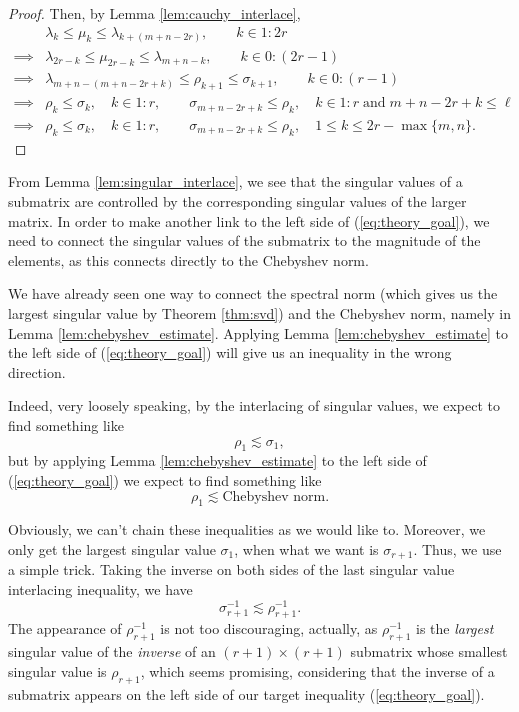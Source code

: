 \documentclass{article}
\begin{document}
\begin{proof}
		Then, by Lemma \ref{lem:cauchy_interlace},
		\begin{align}
			&\lambda_k \le \mu_k \le \lambda_{k+(m+n-2r)}, \qquad k \in 1:2r \\
			\implies&\lambda_{2r-k} \le \mu_{2r-k} \le \lambda_{m+n-k}, \qquad k \in 0:(2r-1) \\
			\implies&\lambda_{m+n -(m+n-2r+k)} \le \rho_{k+1} \le \sigma_{k+1}, \qquad k \in 0:(r-1) \\
			\implies&\rho_k \le \sigma_k, \quad k \in 1:r, \qquad \sigma_{m+n -2r+k} \le \rho_k, \quad k\in 1:r\;\text{and}\;m+n-2r+k \le \ell \\
			\implies&\rho_k \le \sigma_k, \quad k \in 1:r, \qquad \sigma_{m+n -2r+k} \le \rho_k, \quad 1\le k \le 2r-\max\{m,n\}.
		\end{align}
	\end{proof}
	
	From Lemma \ref{lem:singular_interlace}, we see that the singular values of a submatrix are controlled by the corresponding singular values of the larger matrix. In order to make another link to the left side of (\ref{eq:theory_goal}), we need to connect the singular values of the submatrix to the magnitude of the elements, as this connects directly to the Chebyshev norm.
	
	We have already seen one way to connect the spectral norm (which gives us the largest singular value by Theorem \ref{thm:svd}) and the Chebyshev norm, namely in Lemma \ref{lem:chebyshev_estimate}. Applying Lemma \ref{lem:chebyshev_estimate} to the left side of (\ref{eq:theory_goal}) will give us an inequality in the wrong direction.
	
	Indeed, very loosely speaking, by the interlacing of singular values, we expect to find something like
	\begin{equation}
		\rho_{1} \lesssim \sigma_{1},
	\end{equation}
	but by applying Lemma \ref{lem:chebyshev_estimate} to the left side of (\ref{eq:theory_goal}) we expect to find something like
	\begin{equation}
		\rho_{1} \lesssim \text{Chebyshev norm}.
	\end{equation}
	
	Obviously, we can't chain these inequalities as we would like to. Moreover, we only get the largest singular value $\sigma_1$, when what we want is $\sigma_{r+1}$. Thus, we use a simple trick. Taking the inverse on both sides of the last singular value interlacing inequality, we have
	\begin{equation}
		\sigma_{r+1}^{-1} \lesssim \rho_{r+1}^{-1}.
	\end{equation}
	The appearance of $\rho_{r+1}^{-1}$ is not too discouraging, actually, as $\rho_{r+1}^{-1}$ is the \textit{largest} singular value of the \textit{inverse} of an $(r+1)\times (r+1)$ submatrix whose smallest singular value is $\rho_{r+1}$, which seems promising, considering that the inverse of a submatrix appears on the left side of our target inequality (\ref{eq:theory_goal}).
	
\end{document}
